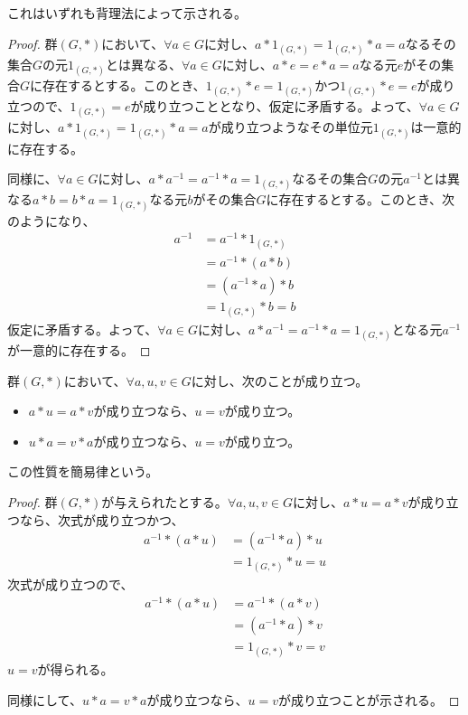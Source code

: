 \documentclass[dvipdfmx]{jsarticle}
\begin{document}
これはいずれも背理法によって示される。
\begin{proof}
群$(G,*)$において、$\forall a \in G$に対し、$a*1_{(G,*)} = 1_{(G,*)}*a = a$なるその集合$G$の元$1_{(G,*)}$とは異なる、$\forall a \in G$に対し、$a*e = e*a = a$なる元$e$がその集合$G$に存在するとする。このとき、$1_{(G,*)}*e = 1_{(G,*)}$かつ$1_{(G,*)}*e = e$が成り立つので、$1_{(G,*)} = e$が成り立つこととなり、仮定に矛盾する。よって、$\forall a \in G$に対し、$a*1_{(G,*)} = 1_{(G,*)}*a = a$が成り立つようなその単位元$1_{(G,*)}$は一意的に存在する。\par
同様に、$\forall a \in G$に対し、$a*a^{- 1} = a^{- 1}*a = 1_{(G,*)}$なるその集合$G$の元$a^{- 1}$とは異なる$a*b = b*a = 1_{(G,*)}$なる元$b$がその集合$G$に存在するとする。このとき、次のようになり、
\begin{align*}
a^{- 1} &= a^{- 1}*1_{(G,*)}\\
&= a^{- 1}*(a*b)\\
&= \left( a^{- 1}*a \right)*b\\
&= 1_{(G,*)}*b = b
\end{align*}
仮定に矛盾する。よって、$\forall a \in G$に対し、$a*a^{- 1} = a^{- 1}*a = 1_{(G,*)}$となる元$a^{- 1}$が一意的に存在する。
\end{proof}
\begin{thm}[簡易律]\label{3.1.1.2}
群$(G,*)$において、$\forall a,u,v \in G$に対し、次のことが成り立つ。
\begin{itemize}
\item
  $a*u = a*v$が成り立つなら、$u = v$が成り立つ。
\item
  $u*a = v*a$が成り立つなら、$u = v$が成り立つ。
\end{itemize}
\par
この性質を簡易律という。
\end{thm}
\begin{proof}
群$(G,*)$が与えられたとする。$\forall a,u,v \in G$に対し、$a*u = a*v$が成り立つなら、次式が成り立つかつ、
\begin{align*}
a^{- 1}*(a*u) &= \left( a^{- 1}*a \right)*u\\
&= 1_{(G,*)}*u = u
\end{align*}
次式が成り立つので、
\begin{align*}
a^{- 1}*(a*u) &= a^{- 1}*(a*v)\\
&= \left( a^{- 1}*a \right)*v\\
&= 1_{(G,*)}*v = v
\end{align*}
$u = v$が得られる。\par
同様にして、$u*a = v*a$が成り立つなら、$u = v$が成り立つことが示される。
\end{proof}
\end{document}
